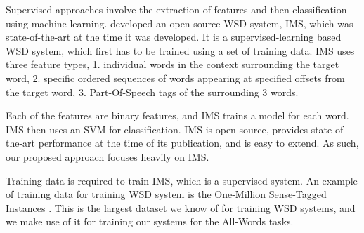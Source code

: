 Supervised approaches involve the extraction of features and then classification using machine learning.  developed an open-source WSD system, IMS, which was state-of-the-art at the time it was developed. It is a supervised-learning based WSD system, which first has to be trained using a set of training data. IMS uses three feature types, 1. individual words in the context surrounding the target word, 2. specific ordered sequences of words appearing at specified offsets from the target word, 3. Part-Of-Speech tags of the surrounding 3 words.

	
	
	

Each of the features are binary features, and IMS trains a model for each word. IMS then uses an SVM for classification. IMS is open-source, provides state-of-the-art performance at the time of its publication, and is easy to extend. As such, our proposed approach focuses heavily on IMS. 

Training data is required to train IMS, which is a supervised system. 
An example of training data for training WSD system is the One-Million Sense-Tagged Instances \cite{taghipour2015one}. This is the largest dataset we know of for training WSD systems, and we make use of it for training our systems for the All-Words tasks. 

